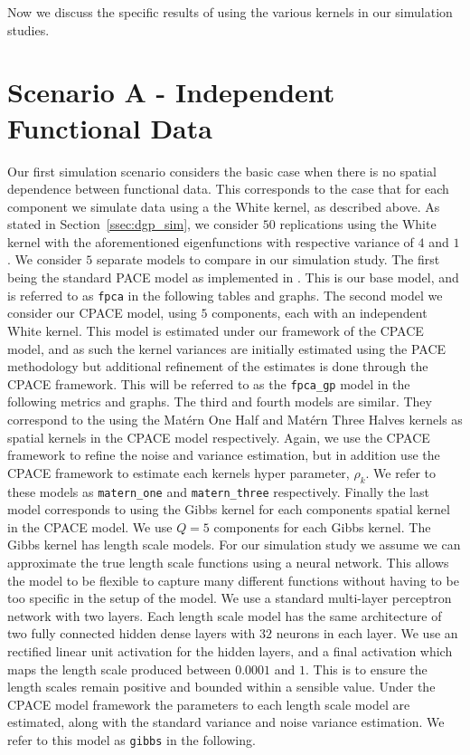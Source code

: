 Now we discuss the specific results of using the various kernels in our simulation studies. 



\section{Scenario A - Independent Functional Data \label{sec:sim_A}}
Our first simulation scenario considers the basic case when there is no spatial dependence between functional data.
This corresponds to the case that for each component we simulate data using a the White kernel, as described above.
As stated in Section~\ref{ssec:dgp_sim}, we consider $50$ replications using the White kernel with the aforementioned eigenfunctions with respective variance of $4$ and $1$. 
We consider $5$ separate models to compare in our simulation study.
The first being the standard PACE model as implemented in \citep{yao_functional_2005}.
This is our base model, and is referred to as \verb*|fpca| in the following tables and graphs. 
The second model we consider our CPACE model, using $5$ components, each with an independent White kernel.
This model is estimated under our framework of the CPACE model, and as such the kernel variances are initially estimated using the PACE methodology but additional refinement of the estimates is done through the CPACE framework.
This will be referred to as the \verb*|fpca_gp| model in the following metrics and graphs.
The third and fourth models are similar.
They correspond to the using the Mat\'ern One Half and Mat\'ern Three Halves kernels as spatial kernels in the CPACE model respectively.
Again, we use the CPACE framework to refine the noise and variance estimation, but in addition use the CPACE framework to estimate each kernels hyper parameter, $\rho_k$.
We refer to these models as \verb*|matern_one| and \verb*|matern_three| respectively.
Finally the last model corresponds to using the Gibbs kernel for each components spatial kernel in the CPACE model.
We use $Q=5$ components for each Gibbs kernel.
The Gibbs kernel has length scale models.
For our simulation study we assume we can approximate the true length scale functions using a neural network.
This allows the model to be flexible to capture many different functions without having to be too specific in the setup of the model.
We use a standard multi-layer perceptron network with two layers.
Each length scale model has the same architecture of two fully connected hidden dense layers with $32$ neurons in each layer.
We use an rectified linear unit activation for the hidden layers, and a final activation which maps the length scale produced between $0.0001$ and $1$.
This is to ensure the length scales remain positive and bounded within a sensible value.
Under the CPACE model framework the parameters to each length scale model are estimated, along with the standard variance and noise variance estimation.
We refer to this model as \verb*|gibbs| in the following.

